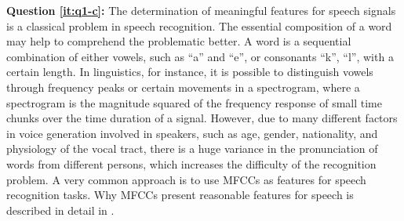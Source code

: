 \textbf{Question \ref{it:q1-c}:} 
The determination of meaningful features for speech signals is a classical problem in speech recognition.
The essential composition of a word may help to comprehend the problematic better.
A word is a sequential combination of either vowels, such as \enquote{a} and \enquote{e}, or consonants \enquote{k}, \enquote{l}, with a certain length. 
In linguistics, for instance, it is possible to distinguish vowels through frequency peaks or certain movements in a spectrogram, where a spectrogram is the magnitude squared of the frequency response of small time chunks over the time duration of a signal.
However, due to many different factors in voice generation involved in speakers, such as age, gender, nationality, and physiology of the vocal tract, there is a huge variance in the pronunciation of words from different persons, which increases the difficulty of the recognition problem.
A very common approach is to use MFCCs as features for speech recognition tasks.
Why MFCCs present reasonable features for speech is described in detail in .



